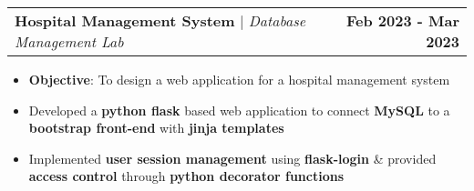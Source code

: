 \documentclass[letterpaper]{article}
\makeatletter
\newcommand{\resumeItem}[1]{
  \item\small{
    {#1 \vspace{-2pt}}
  }
}
\newcommand{\resumeItemNoBullet}[1]{
  \item[]\small{
    {#1 \vspace{-2pt}}
  }
}
\newcommand{\resumeProjectHeading}[2]{
    \item
    \begin{tabular*}{1.001\textwidth}{l@{\extracolsep{\fill}}r}
      \small#1 & \textbf{\small #2}\\
    \end{tabular*}\vspace{-7pt}
}
\newcommand{\resumeItemListStart}{\begin{itemize}}
\newcommand{\resumeItemListEnd}{\end{itemize}\vspace{-5pt}}
\makeatother
\begin{document}
      \resumeProjectHeading
        {\textbf{Hospital Management System} $|$ \emph{Database Management Lab}}{Feb 2023 - Mar 2023}
        \resumeItemListStart
          \resumeItemNoBullet{\textbf{Objective}: To design a web application for a hospital management system}
          \resumeItem{Developed a \textbf{python flask} based web application to connect \textbf{MySQL} to a \textbf{bootstrap front-end} with \textbf{jinja templates}}
          \resumeItem{Implemented \textbf{user session management} using \textbf{flask-login} \& provided \textbf{access control} through \textbf{python decorator functions}}
        \resumeItemListEnd 



\end{document}
